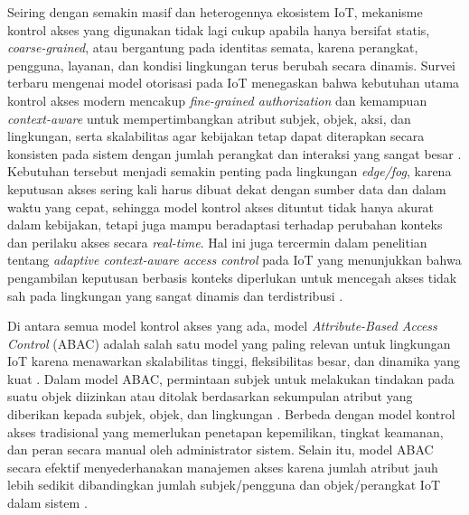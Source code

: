 Seiring dengan semakin masif dan heterogennya ekosistem IoT, mekanisme kontrol akses yang digunakan tidak lagi cukup apabila hanya bersifat statis, \textit{coarse-grained}, atau bergantung pada identitas semata, karena perangkat, pengguna, layanan, dan kondisi lingkungan terus berubah secara dinamis. Survei terbaru mengenai model otorisasi pada IoT menegaskan bahwa kebutuhan utama kontrol akses modern mencakup \textit{fine-grained authorization} dan kemampuan \textit{context-aware} untuk mempertimbangkan atribut subjek, objek, aksi, dan lingkungan, serta skalabilitas agar kebijakan tetap dapat diterapkan secara konsisten pada sistem dengan jumlah perangkat dan interaksi yang sangat besar \parencite{diaz_authorization_2025,ragothaman_access_2023}. Kebutuhan tersebut menjadi semakin penting pada lingkungan \textit{edge/fog}, karena keputusan akses sering kali harus dibuat dekat dengan sumber data dan dalam waktu yang cepat, sehingga model kontrol akses dituntut tidak hanya akurat dalam kebijakan, tetapi juga mampu beradaptasi terhadap perubahan konteks dan perilaku akses secara \textit{real-time}. Hal ini juga tercermin dalam penelitian tentang \textit{adaptive context-aware access control} pada IoT yang menunjukkan bahwa pengambilan keputusan berbasis konteks diperlukan untuk mencegah akses tidak sah pada lingkungan yang sangat dinamis dan terdistribusi \parencite{kalaria_adaptive_2024}.

Di antara semua model kontrol akses yang ada, model \textit{Attribute-Based Access Control} (ABAC) adalah salah satu model yang paling relevan untuk lingkungan IoT karena menawarkan skalabilitas tinggi, fleksibilitas besar, dan dinamika yang kuat \parencite{hu_guide_2014}. Dalam model ABAC, permintaan subjek untuk melakukan tindakan pada suatu objek diizinkan atau ditolak berdasarkan sekumpulan atribut yang diberikan kepada subjek, objek, dan lingkungan \parencite{diaz_authorization_2025}. Berbeda dengan model kontrol akses tradisional yang memerlukan penetapan kepemilikan, tingkat keamanan, dan peran secara manual oleh administrator sistem. Selain itu, model ABAC secara efektif menyederhanakan manajemen akses karena jumlah atribut jauh lebih sedikit dibandingkan jumlah subjek/pengguna dan objek/perangkat IoT dalam sistem \parencite{bakhtiary_combo-chain_2024}.

